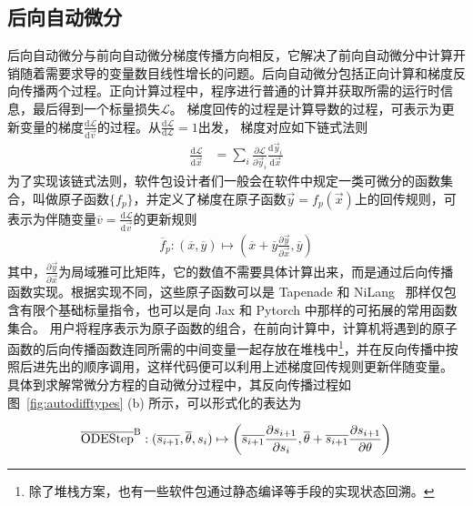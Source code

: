 \documentclass[A4,twoside,UTF8]{ctexart}
\def\D{\mathrm{d}}
\begin{document}
\subsection{后向自动微分}
后向自动微分与前向自动微分梯度传播方向相反，它解决了前向自动微分中计算开销随着需要求导的变量数目线性增长的问题。后向自动微分包括正向计算和梯度反向传播两个过程。正向计算过程中，程序进行普通的计算并获取所需的运行时信息，最后得到一个标量损失$\mathcal{L}$。
梯度回传的过程是计算导数的过程，可表示为更新变量的梯度$\frac{\D \mathcal{L}}{\D \vec v}$的过程。从$\frac{\D\mathcal L}{\D\mathcal L} = 1$出发，
梯度对应如下链式法则
\begin{align*}
    \frac{\D \mathcal{L}}{\D \vec x} &= \sum_{i}\frac{\partial \mathcal{L}}{\partial \vec y_i}\frac{\D \vec y_i}{\D \vec x}
\end{align*}
为了实现该链式法则，软件包设计者们一般会在软件中规定一类可微分的函数集合，叫做原子函数$\{f_p\}$，并定义了梯度在原子函数$\vec y=f_p(\vec x)$上的回传规则，可表示为伴随变量$\overline{v} = \frac{\D \mathcal{L}}{\D \vec v}$的更新规则
\begin{align*}
    \overline f_p: (\overline x, \overline y) \mapsto (\overline x + \overline y\frac{\partial \vec y}{\partial \vec x}, \overline y)
\end{align*}
其中，$\frac{\partial \vec y}{\partial \vec x}$为局域雅可比矩阵，它的数值不需要具体计算出来，而是通过后向传播函数实现。根据实现不同，这些原子函数可以是 Tapenade 和 NiLang~\cite{Liu2020b} 那样仅包含有限个基础标量指令，也可以是向 Jax 和 Pytorch 中那样的可拓展的常用函数集合。
用户将程序表示为原子函数的组合，在前向计算中，计算机将遇到的原子函数的后向传播函数连同所需的中间变量一起存放在堆栈中\footnote{除了堆栈方案，也有一些软件包通过静态编译等手段的实现状态回溯。}，并在反向传播中按照后进先出的顺序调用，这样代码便可以利用上述梯度回传规则更新伴随变量。
具体到求解常微分方程的自动微分过程中，其反向传播过程如图~\ref{fig:autodifftypes} (b) 所示，可以形式化的表达为

\begin{align*}
    \overline{\rm ODEStep}^{\rm B} : (\overline{s_{i+1}}, \overline\theta, s_i) \mapsto %
    \left(\overline{s_{i+1}}\frac{\partial s_{i+1}}{\partial s_{i}}
    ,\overline{\theta} + \overline{s_{i+1}}\frac{\partial s_{i+1}}{\partial \theta}\right)%
\end{align*}
\end{document}
